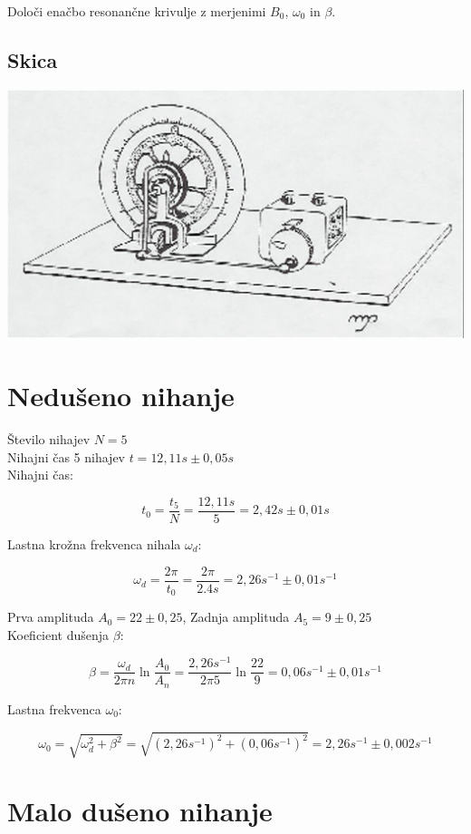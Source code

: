 \documentclass[a4paper]{report}
\begin{document}
\noindent Določi enačbo resonančne krivulje z merjenimi $B_0$, $\omega_0$ in $\beta$.


\section*{Skica}
\includegraphics[width=\textwidth]{Skica}



\chapter*{Nedušeno nihanje}

Število nihajev $N = 5$\\
Nihajni čas 5 nihajev $ t = 12,11s \pm 0,05s$\\
Nihajni čas:

\[
  t_0 = \frac{t_5}{N} = \frac {12,11s}{5} = 2,42s \pm 0,01s
\]

Lastna krožna frekvenca nihala $\omega_d$:

\[
  \omega_d = \frac{2\pi}{t_0} = \frac{2\pi}{2.4s} =2,26s^{-1} \pm 0,01s^{-1}
\]

Prva amplituda $A_0 = 22 \pm 0,25$, Zadnja amplituda $A_5 = 9 \pm 0,25$\\
Koeficient dušenja $\beta$:

\[
  \beta = \frac{\omega_d}{2\pi n}\ln\frac{A_0}{A_n} = \frac{2,26s^{-1}}{2 \pi 5}\ln\frac{22}{9} =0,06s^{-1} \pm 0,01s^{-1}
\]

Lastna frekvenca $\omega_0$:

\[
  \omega_0 = \sqrt{\omega_d^2 + \beta^2} = \sqrt{(2,26s^{-1})^2 + (0,06s^{-1})^2} =2,26s^{-1} \pm 0,002s^{-1}
\]

\chapter*{Malo dušeno nihanje}
\end{document}
